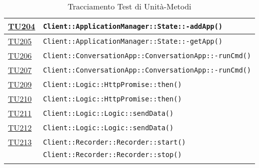 \begin{longtable}{|>{\centering}m{1cm}|m{12cm}<{\centering}|}
\hyperlink{TU204}{TU204} & \texttt{Client::ApplicationManager::State::-\linebreak addApp()}\\ \hline

\hyperlink{TU205}{TU205} & \texttt{Client::ApplicationManager::State::-\linebreak getApp()}\\ \hline

\hyperlink{TU206}{TU206} & \texttt{Client::ConversationApp::ConversationApp::-\linebreak runCmd()}\\ \hline

\hyperlink{TU207}{TU207} & \texttt{Client::ConversationApp::ConversationApp::-\linebreak runCmd()}\\ \hline

\hyperlink{TU209}{TU209} & \texttt{Client::Logic::HttpPromise::then()}\\ \hline

\hyperlink{TU210}{TU210} & \texttt{Client::Logic::HttpPromise::then()}\\ \hline

\hyperlink{TU211}{TU211} & \texttt{Client::Logic::Logic::sendData()}\\ \hline

\hyperlink{TU212}{TU212} & \texttt{Client::Logic::Logic::sendData()}\\ \hline

\hyperlink{TU213}{TU213} & \texttt{Client::Recorder::Recorder::start()}\\ & \texttt{Client::Recorder::Recorder::stop()}\\ \hline

\caption[Tracciamento Test di Unità-Metodi]{Tracciamento Test di Unità-Metodi}
\label{tabella:tu-met}
\end{longtable}
\clearpage
